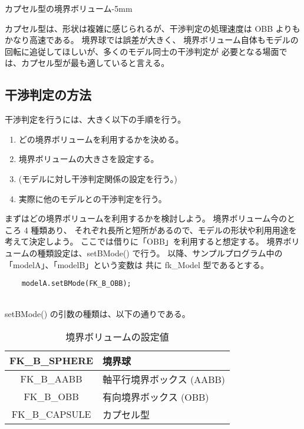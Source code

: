 	{カプセル型の境界ボリューム}{-5mm}

カプセル型は、形状は複雑に感じられるが、干渉判定の処理速度は OBB よりもかなり高速である。
境界球では誤差が大きく、
境界ボリューム自体もモデルの回転に追従してほしいが、多くのモデル同士の干渉判定が
必要となる場面では、カプセル型が最も適していると言える。

\subsection{干渉判定の方法}
干渉判定を行うには、大きく以下の手順を行う。
\begin{enumerate}
 \item どの境界ボリュームを利用するかを決める。
 \item 境界ボリュームの大きさを設定する。
 \item (モデルに対し干渉判定関係の設定を行う。)
 \item 実際に他のモデルとの干渉判定を行う。
\end{enumerate}
まずはどの境界ボリュームを利用するかを検討しよう。
境界ボリューム今のところ 4 種類あり、
それぞれ長所と短所があるので、モデルの形状や利用用途を考えて決定しよう。
ここでは借りに「OBB」を利用すると想定する。
境界ボリュームの種類設定は、setBMode() で行う。
以降、サンプルプログラム中の「modelA」、「modelB」という変数は
共に fk\_Model 型であるとする。
\\
\begin{breakbox}
\begin{verbatim}
    modelA.setBMode(FK_B_OBB);
\end{verbatim}
\end{breakbox}
~ \\
setBMode() の引数の種類は、以下の通りである。
\begin{table}[H]
\caption{境界ボリュームの設定値}
\label{tbl:bmode}
\begin{center}
\begin{tabular}{|c|l|}
\hline
FK\_B\_SPHERE & 境界球 \\ \hline
FK\_B\_AABB & 軸平行境界ボックス (AABB) \\ \hline
FK\_B\_OBB & 有向境界ボックス (OBB) \\ \hline
FK\_B\_CAPSULE & カプセル型 \\ \hline
\end{tabular}
\end{center}
\end{table}

